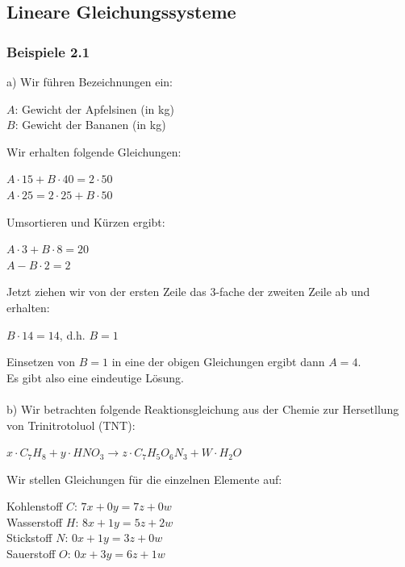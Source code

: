 \documentclass{article}
\begin{document}
\subsection{Lineare Gleichungssysteme}
\subsubsection*{Beispiele 2.1}
a) Wir führen Bezeichnungen ein: \\
\begin{center}
    $A$: Gewicht der Apfelsinen (in kg) \\
    $B$: Gewicht der Bananen (in kg)
\end{center}
Wir erhalten folgende Gleichungen: 
\begin{center}
    $A \cdot 15 + B \cdot 40 = 2 \cdot 50$ \\
    $A \cdot 25 = 2 \cdot 25 + B \cdot 50$ \\
\end{center}
Umsortieren und Kürzen ergibt:
\begin{center}
    $A \cdot 3 + B \cdot 8 = 20$ \\
    $A - B \cdot 2 = 2$ \\
\end{center}
Jetzt ziehen wir von der ersten Zeile das 3-fache der zweiten Zeile ab und erhalten:
\begin{center}
    $B \cdot 14 = 14$, d.h. $B = 1$ \\
\end{center}
Einsetzen von $B = 1$ in eine der obigen Gleichungen ergibt dann $A = 4$. \\
Es gibt also eine eindeutige Lösung. \\ 
\\
b) Wir betrachten folgende Reaktionsgleichung aus der Chemie zur Hersetllung von Trinitrotoluol (TNT): \\
\begin{center}
    $x \cdot C_7H_8 + y \cdot HNO_3 \rightarrow z \cdot C_7H_5O_6N_3 + W \cdot H_2O$ \\   
\end{center}
Wir stellen Gleichungen für die einzelnen Elemente auf: \\
\begin{center}
    Kohlenstoff $C$: $7x + 0y = 7z + 0w$ \\
    Wasserstoff $H$: $8x + 1y = 5z + 2w$ \\
    Stickstoff $N$: $0x + 1y = 3z + 0w$ \\
    Sauerstoff $O$: $0x + 3y = 6z + 1w$ \\
\end{center}
\end{document}
